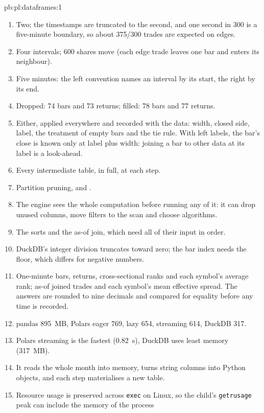 \begin{solution}{pb:pl:dataframes:1}
\begin{enumerate}
\item Two; the timestamps are truncated to the second, and one second in 300 is a five-minute boundary, so about 375/300 trades are
expected on edges.
\item Four intervals; 600 shares move (each edge trade leaves one bar and enters its neighbour).
\item Five minutes: the left convention names an interval by its start, the right by its end.
\item Dropped: 74 bars and 73 returns; filled: 78 bars and 77 returns.
\item Either, applied everywhere and recorded with the data: width, closed side, label, the treatment of empty bars and the tie rule. With
left labels, the bar's close is known only at label plus width: joining a bar to other data at its label is a look-ahead.
\item Every intermediate table, in full, at each step.
\item Partition pruning,  and .
\item The engine sees the whole computation before running any of it: it can drop unused columns, move filters to the scan and choose
algorithms.
\item The sorts and the as-of join, which need all of their input in order.
\item DuckDB's integer division truncates toward zero; the bar index needs the floor, which differs for negative numbers.
\item One-minute bars, returns, cross-sectional ranks and each symbol's average rank; as-of joined trades and each symbol's mean effective
spread. The answers are rounded to nine decimals and compared for equality before any time is recorded.
\item pandas 895~MB, Polars eager 769, lazy 654, streaming 614, DuckDB 317.
\item Polars streaming is the fastest (0.82~s), DuckDB uses least memory (317~MB).
\item It reads the whole month into memory, turns string columns into Python objects, and each step materialises a new table.
\item Resource usage is preserved across \texttt{exec} on Linux, so the child's \texttt{getrusage} peak can include the memory of the process

\end{enumerate}
\end{solution}
